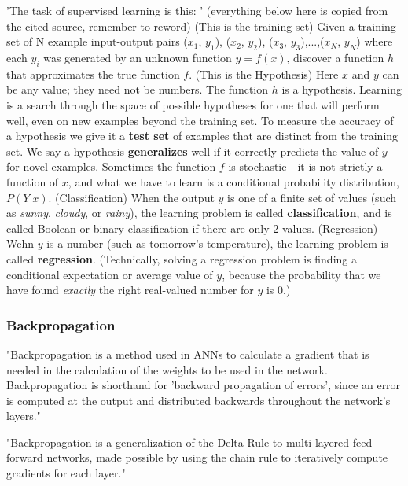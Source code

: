 'The task of supervised learning is this: ' \cite{russell2016artificial} (everything below here is copied from the cited source, remember to reword)
(This is the training set)
Given a training set of N example input-output pairs
($x_1$, $y_1$), ($x_2$, $y_2$), ($x_3$, $y_3$),...,($x_N$, $y_N$)
where each $y_i$ was generated by an unknown function $y=f(x)$, discover a function $h$ that approximates the true function $f$.
(This is the Hypothesis)
Here $x$ and $y$ can be any value; they need not be numbers. The function $h$ is a hypothesis. Learning is a search through the space of possible hypotheses for one that will perform well, even on new examples beyond the training set. To measure the accuracy of a hypothesis we give it a \textbf{test set} of examples that are distinct from the training set. We say a hypothesis \textbf{generalizes} well if it correctly predicts the value of $y$ for novel examples. Sometimes the function $f$ is stochastic - it is not strictly a function of $x$, and what we have to learn is a conditional probability distribution, $P(Y|x)$.
(Classification)
When the output $y$ is one of a finite set of values (such as \textit{sunny}, \textit{cloudy}, or \textit{rainy}), the learning problem is called \textbf{classification}, and is called Boolean or binary classification if there are only 2 values.
(Regression)
Wehn $y$ is a number (such as tomorrow's temperature), the learning problem is called \textbf{regression}. (Technically, solving a regression problem is finding a conditional expectation or average value of $y$, because the probability that we have found \textit{exactly} the right real-valued number for $y$ is 0.)


\subsubsection{Backpropagation}

"Backpropagation is a method used in ANNs to calculate a gradient that is needed in the calculation of the weights to be used in the network. Backpropagation is shorthand for 'backward propagation of errors', since an error is computed at the output and distributed backwards throughout the network's layers."

"Backpropagation is a generalization of the Delta Rule to multi-layered feed-forward networks, made possible by using the chain rule to iteratively compute gradients for each layer."

